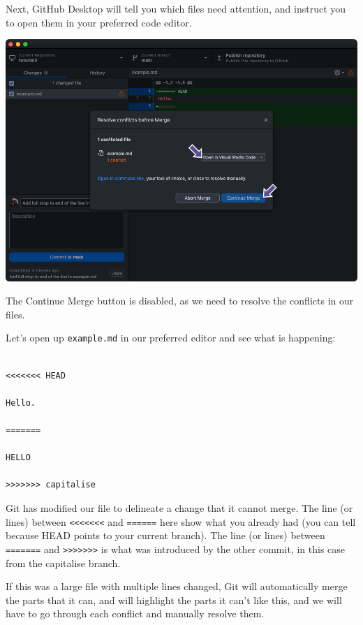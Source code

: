 \documentclass[
  letterpaper,
  DIV=11,
  numbers=noendperiod]{scrartcl}
\begin{document}
Next, GitHub Desktop will tell you which files need attention, and
instruct you to open them in your preferred code editor.

\includegraphics{images/image53.png}

The Continue Merge button is disabled, as we need to resolve the
conflicts in our files.

Let's open up \texttt{example.md} in our preferred editor and see what
is happening:

\begin{verbatim}

<<<<<<< HEAD

Hello.

=======

HELLO

>>>>>>> capitalise
\end{verbatim}

Git has modified our file to delineate a change that it cannot merge.
The line (or lines) between
\texttt{\textless{}\textless{}\textless{}\textless{}\textless{}\textless{}\textless{}}
and \texttt{======} here show what you already had (you can tell because
HEAD points to your current branch). The line (or lines) between
\texttt{=======} and
\texttt{\textgreater{}\textgreater{}\textgreater{}\textgreater{}\textgreater{}\textgreater{}\textgreater{}}
is what was introduced by the other commit, in this case from the
capitalise branch.

If this was a large file with multiple lines changed, Git will
automatically merge the parts that it can, and will highlight the parts
it can't like this, and we will have to go through each conflict and
manually resolve them.
\end{document}
